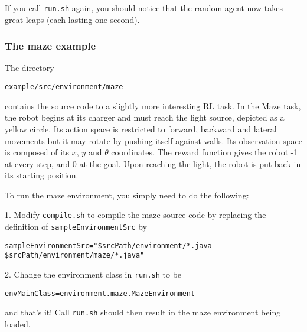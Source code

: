 \documentclass[12pt]{article}
\newcommand{\code}[1]{\texttt{#1}}
\begin{document}
If you call \code{run.sh} again, you should notice that the random agent
now takes great leaps (each lasting one second).

\subsubsection{The maze example}

The directory

\begin{verbatim}
example/src/environment/maze
\end{verbatim}

contains the source code to a slightly more interesting RL task. In the Maze
task, the robot begins at its charger and must reach the light source,
depicted as a yellow circle. Its action space is restricted to forward,
backward and lateral movements but it may rotate by pushing itself against
walls. Its observation space is composed of its $x$, $y$ and $\theta$
coordinates. The reward function gives the robot -1 at every step, and 0
at the goal. Upon reaching the light, the robot is put back in its starting
position.

To run the maze environment, you simply need to do the following:

1. Modify \code{compile.sh} to compile the maze source code by replacing the
definition of \code{sampleEnvironmentSrc} by

\begin{verbatim}
sampleEnvironmentSrc="$srcPath/environment/*.java $srcPath/environment/maze/*.java"
\end{verbatim}

2. Change the environment class in \code{run.sh} to be

\begin{verbatim}
envMainClass=environment.maze.MazeEnvironment
\end{verbatim}

and that's it! Call \code{run.sh} should then result in the maze environment being
loaded.
\end{document}
